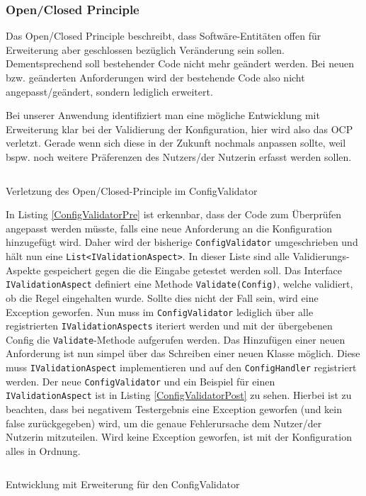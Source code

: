 \subsubsection{Open/Closed Principle}
Das Open/Closed Principle beschreibt, dass Softwäre-Entitäten offen für Erweiterung aber geschlossen bezüglich Veränderung sein sollen. Dementsprechend soll bestehender Code nicht mehr geändert werden. Bei neuen bzw. geänderten Anforderungen wird der bestehende Code also nicht angepasst/geändert, sondern lediglich erweitert.

Bei unserer Anwendung identifiziert man eine mögliche Entwicklung mit Erweiterung klar bei der Validierung der Konfiguration, hier wird also das OCP verletzt. Gerade wenn sich diese in der Zukunft nochmals anpassen sollte, weil bspw. noch weitere Präferenzen des Nutzers/der Nutzerin erfasst werden sollen.
\begin{listing}[h]
\inputminted[linenos=true,frame=lines]{csharp}{Listings/ValidateInputsPre.cs}
\caption{Verletzung des Open/Closed-Principle im ConfigValidator}
\label{ConfigValidatorPre}
\end{listing}
In Listing \ref{ConfigValidatorPre} ist erkennbar, dass der Code zum Überprüfen angepasst werden müsste, falls eine neue Anforderung an die Konfiguration hinzugefügt wird. Daher wird der bisherige \texttt{ConfigValidator} umgeschrieben und hält nun eine \texttt{List<IValidationAspect>}. In dieser Liste sind alle Validierungs-Aspekte gespeichert gegen die die Eingabe getestet werden soll. Das Interface \texttt{IValidationAspect} definiert eine Methode \texttt{Validate(Config)}, welche validiert, ob die Regel eingehalten wurde. Sollte dies nicht der Fall sein, wird eine Exception geworfen. Nun muss im \texttt{ConfigValidator} lediglich über alle registrierten \texttt{IValidationAspects} iteriert werden und mit der übergebenen Config die \texttt{Validate}-Methode aufgerufen werden. Das Hinzufügen einer neuen Anforderung ist nun simpel über das Schreiben einer neuen Klasse möglich. Diese muss \texttt{IValidationAspect} implementieren und auf den \texttt{ConfigHandler} registriert werden. Der neue \texttt{ConfigValidator} und ein Beispiel für einen \texttt{IValidationAspect} ist in Listing \ref{ConfigValidatorPost} zu sehen. Hierbei ist zu beachten, dass bei negativem Testergebnis eine Exception geworfen (und kein false zurückgegeben) wird, um die genaue Fehlerursache dem Nutzer/der Nutzerin mitzuteilen. Wird keine Exception geworfen, ist mit der Konfiguration alles in Ordnung.

\begin{listing}[h]
\inputminted[linenos=true,frame=lines]{csharp}{Listings/ValidateInputsPost.cs}
\caption{Entwicklung mit Erweiterung für den ConfigValidator}
\label{ConfigValidatorPost}
\end{listing}

